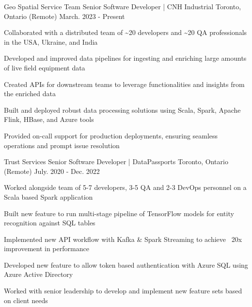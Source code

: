 \begin{cventries}


\cventry
    {Geo Spatial Service Team}
    {Senior Software Developer | CNH Industrial}
    {Toronto, Ontario (Remote)}
    {March. 2023 - Present}
    {
      \begin{cvitems}
 	 \item {Collaborated with a distributed team of \textasciitilde 20 developers and \textasciitilde 20 QA professionals in the USA, Ukraine, and India}
 	 \item {Developed and improved data pipelines for ingesting and enriching large amounts of live field equipment data}
  	\item {Created APIs for downstream teams to leverage functionalities and insights from the enriched data}
        \item {Built and deployed robust data processing solutions using Scala, Spark, Apache Flink, HBase, and Azure tools}
  	\item {Provided on-call support for production deployments, ensuring seamless operations and prompt issue resolution}
      \end{cvitems}
    }


\cventry
    {Trust Services}
    {Senior Software Developer | DataPassports}
    {Toronto, Ontario (Remote)}
    {July. 2020 - Dec. 2022}
    {
      \begin{cvitems}
	\item {Worked alongside team of 5-7 developers, 3-5 QA and 2-3 DevOps personnel on a Scala based Spark application}
        \item {Built new feature to run multi-stage pipeline of TensorFlow models for entity recognition against SQL tables}
	\item {Implemented new API workflow with Kafka \& Spark Streaming to achieve ~20x improvement in performance}
        \item {Developed new feature to allow token based authentication with Azure SQL using Azure Active Directory}
        \item {Worked with senior leadership to develop and implement new feature sets based on client needs}
      \end{cvitems}
    }


\end{cventries}
